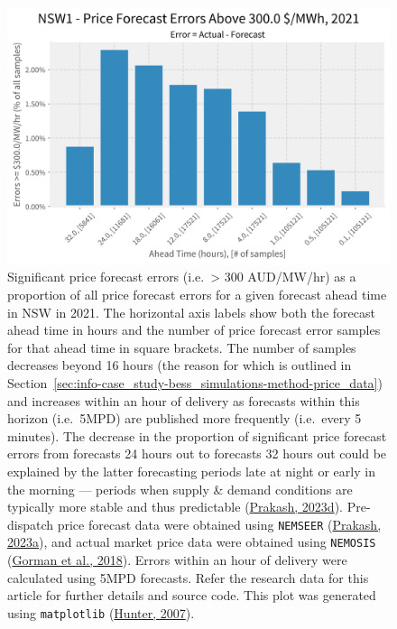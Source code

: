 \documentclass[12pt,a4paper,]{report}
\begin{document}
\begin{figure}
\hypertarget{fig:nsw_significant_price_error_counts}{%
\centering
\includegraphics{source/figures/NSW1_percent_above_300.0_2021.png}
\caption{Significant price forecast errors (i.e.~\textgreater{} 300
AUD/MW/hr) as a proportion of all price forecast errors for a given
forecast ahead time in NSW in 2021. The horizontal axis labels show both
the forecast ahead time in hours and the number of price forecast error
samples for that ahead time in square brackets. The number of samples
decreases beyond 16 hours (the reason for which is outlined in
Section~\ref{sec:info-case_study-bess_simulations-method-price_data})
and increases within an hour of delivery as forecasts within this
horizon (i.e.~5MPD) are published more frequently (i.e.~every 5
minutes). The decrease in the proportion of significant price forecast
errors from forecasts 24 hours out to forecasts 32 hours out could be
explained by the latter forecasting periods late at night or early in
the morning --- periods when supply \& demand conditions are typically
more stable and thus predictable
(\protect\hyperlink{ref-prakashLookingPredispatchDemand2023}{Prakash,
2023d}). Pre-dispatch price forecast data were obtained using
\texttt{NEMSEER} (\protect\hyperlink{ref-prakashNEMSEER2023}{Prakash,
2023a}), and actual market price data were obtained using
\texttt{NEMOSIS}
(\protect\hyperlink{ref-gormanNEMOSISNEMOpen2018}{Gorman et al., 2018}).
Errors within an hour of delivery were calculated using 5MPD forecasts.
Refer the research data for this article for further details and source
code. This plot was generated using \texttt{matplotlib}
(\protect\hyperlink{ref-hunterMatplotlib2DGraphics2007}{Hunter,
2007}).}\label{fig:nsw_significant_price_error_counts}
}
\end{figure}
\end{document}

